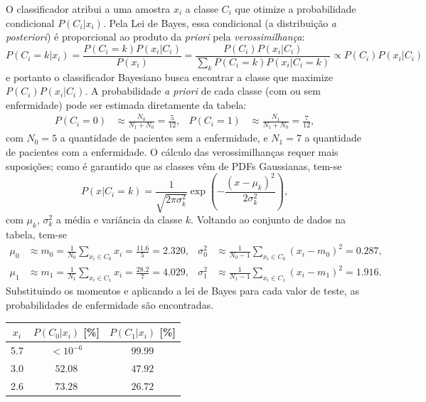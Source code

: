 O classificador atribui a uma amostra $x_i$ a classe $C_i$ que otimize a probabilidade condicional 
$P(C_i | x_i)$. Pela Lei de Bayes, essa condicional (a distribuição \textit{a posteriori}) 
é proporcional ao produto da \textit{priori} pela \textit{verossimilhança}:
%
\begin{equation}
    P(C_i = k | x_i) 
    = \frac{P(C_i = k) P(x_i | C_i)}{P(x_i)}
    = \frac{P(C_i) P(x_i | C_i)}{\sum_k P(C_i=k)P(x_i | C_i=k)}
    \propto P(C_i) P(x_i | C_i)
\end{equation}
%
e portanto o classificador Bayesiano busca encontrar a classe que maximize $P(C_i) P(x_i | C_i)$.
A probabilidade \textit{a priori} de cada classe (com ou sem enfermidade) pode ser estimada diretamente da tabela:
%
\begin{align}
    P(C_i=0) &\approx \frac{N_0}{N_1 + N_0} = \frac{5}{12}, &
    P(C_i=1) &\approx \frac{N_1}{N_1 + N_0} = \frac{7}{12},
\end{align}
%
com 
$N_0=5$ a quantidade de pacientes sem a enfermidade, e 
$N_1=7$ a quantidade de pacientes com a enfermidade.
O cálculo das verossimilhanças requer mais suposições;
como é garantido que as classes vêm de PDFs Gaussianas, tem-se
%
\begin{equation}
    P(x | C_i = k) = 
    \frac{1}{\sqrt{2\pi\sigma_k^2}}
    \exp\left(
        -\frac{(x-\mu_k)^2}{2\sigma_k^2}
    \right),
\end{equation}
%
com $\mu_k$, $\sigma_k^2$ a média e variância da classe $k$.
Voltando ao conjunto de dados na tabela, tem-se
%
\begin{align}
    \mu_0 &\approx m_0 = \frac{1}{N_0} \sum_{x_i\in C_0} x_i = \frac{11.6}{5} = 2.320, &
    \sigma_0^2 &\approx \frac{1}{N_0-1} \sum_{x_i\in C_0} (x_i - m_0)^2 = 0.287, \\
    \mu_1 &\approx m_1 = \frac{1}{N_1} \sum_{x_i\in C_1} x_i = \frac{28.2}{7} = 4.029, &
    \sigma_1^2 &\approx \frac{1}{N_1-1} \sum_{x_i\in C_1} (x_i - m_1)^2 = 1.916.
\end{align}
%
Substituindo os momentos e aplicando a lei de Bayes para cada valor de teste, 
as probabilidades de enfermidade são encontradas.

\begin{table}[htbp!]
    \centering
    \begin{tabular}{c c c}
    \toprule
        $x_i$ & $P(C_0 | x_i)$ [\%] & $P(C_1 | x_i)$ [\%] \\
    \midrule
        5.7 & $<10^{-6}$ & $99.99$ \\
        3.0 & $52.08$ & $47.92$ \\
        2.6 & $73.28$ & $26.72$ \\
    \bottomrule
    \end{tabular}
\end{table}